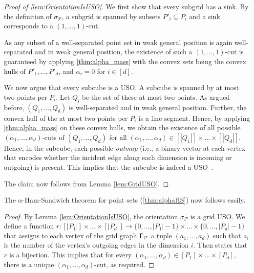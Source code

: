 \documentclass[a4paper,UKenglish,cleveref, autoref, thm-restate, nolineno]{socg-lipics-v2021}
\newcommand{\f}[1]{\relax\ifmmode#1\else{$#1$}\fi}
\newcommand{\Grid}{\f{\Gamma}\xspace}
\begin{document}
\begin{proof}[Proof of \cref{lem:OrientationIsUSO}]
We first show that every subgrid has a sink. 
By the definition of $\sigma_{\mathcal{P}}$, a subgrid is spanned by subsets $P'_i\subseteq P_i$ and a sink corresponds to a $(1,\dots,1)$-cut. 

As any subset of a well-separated point set in weak general position is again well-separated and in weak general position, the existence of such a $(1,\dots,1)$-cut is guaranteed by applying \cref{thm:alpha_mass} with the convex sets being the convex hulls of $P'_1, \dots, P'_d$, and $\alpha_i = 0$ for $i \in [d]$.

We now argue that every subcube is a USO. 
A subcube is spanned by at most two points per $P_i$. 
Let $Q_i$ be the set of these at most two points.
As argued before, $(Q_1, \dots, Q_d)$ is well-separated and in weak general position.
Further, the convex hull of the at most two points per $P_i$ is a line segment.
Hence, by applying \cref{thm:alpha_mass} on these convex hulls, we obtain the existence of all possible $(\alpha_1, \dots, \alpha_d)$-cuts of $(Q_1, \dots, Q_d)$ for all $(\alpha_1, \dots, \alpha_d) \in [|Q_1|] \times \dots \times [|Q_d|]$.
Hence, in the subcube, each possible \emph{outmap} (i.e., a binary vector at each vertex that encodes whether the incident edge along each dimension is incoming or outgoing) is present.
This implies that the subcube is indeed a USO~\cite{szabo2001usos}.

The claim now follows from Lemma \ref{lem:GridUSO}.
\end{proof}

The $\alpha$-Ham-Sandwich theorem for point sets (\cref{thm:alphaHS}) now follows easily.

\alphaHS*

\begin{proof}
By Lemma \ref{lem:OrientationIsUSO}, the orientation $\sigma_{\mathcal{P}}$ is a grid USO. 
We define a function $r : [|P_1|] \times \dots \times [|P_d|] \to \{0, \dots, |P_1|-1\} \times \dots \times \{0, \dots, |P_d|-1\}$ that assigns to each vertex of the grid graph $\Grid_{\mathcal{P}}$ a tuple $(a_1, \dots, a_d)$ such that $a_i$ is the number of the vertex's outgoing edges in the dimension $i$.
Then \cite[Theorem 2.14]{gaertner2008grids} states that $r$ is a bijection.
This implies that for every $(\alpha_1,\ldots,\alpha_d) \in [P_1] \times \dots \times [P_d]$, there is a unique $(\alpha_1,\ldots,\alpha_d)$-cut, as required.
\end{proof}
\end{document}
